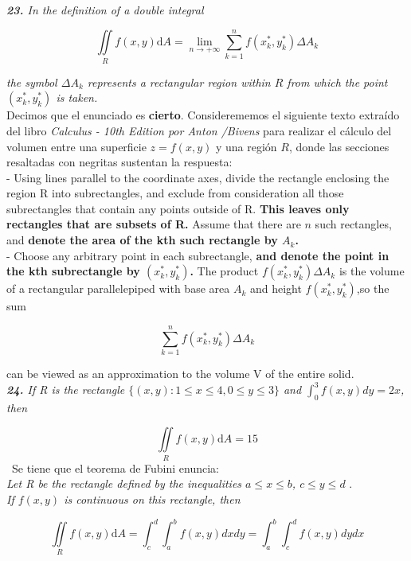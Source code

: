 \documentclass[a4paper,12pt]{article}
\begin{document}
	\textit{\textbf{23.} In the definition of a double integral}

		$$  \iint\limits_{R} f(x,y)\mathrm{d}A = \lim\limits_{n \rightarrow + \infty}
		 	\sum_{k=1}^{n} f(x^{*}_{k}, y^{*}_{k}) \Delta A_{k} $$

	\textit{ the symbol $ \Delta A_{k}$ represents a rectangular region within $R$
	 		from which the point $ (x^{*}_{k}, y^{*}_{k}) $ is taken.}\\

	Decimos que el enunciado es \textbf{cierto}. Considerememos el siguiente texto extraído
	del libro \textit{Calculus - 10th Edition por Anton /Bivens} para realizar el
	cálculo del volumen entre una superficie $ z = f(x,y)$ y una región $R$, donde
	las secciones resaltadas con negritas sustentan la respuesta: \\

	- Using lines parallel to the coordinate axes, divide the rectangle
	enclosing the region R into subrectangles, and exclude from consideration
	all those subrectangles that contain any points outside of R.
	\textbf{This leaves only rectangles that are subsets of R.} Assume that there are $n$
	such rectangles, and \textbf{denote the area of the kth such rectangle by $A_k$.} \\

	- Choose any arbitrary point in each subrectangle, \textbf{and denote the point in
	the kth subrectangle by $ (x^{*}_{k}, y^{*}_{k}) $.} The product
	$ f(x^{*}_{k}, y^{*}_{k}) \Delta A_k$  is the volume of a rectangular
	parallelepiped with base area $A_k$ and height $f(x^{*}_{k}, y^{*}_{k})$,so the sum

		$$ \sum_{k=1}^{n} f(x^{*}_{k}, y^{*}_{k}) \Delta A_{k} $$

	can be viewed as an approximation to the volume V of the entire solid.\\

	\textit{\textbf{24.} If R is the rectangle $ \{(x,y):1 \leq x \leq 4,0 \leq y \leq 3\} $
			and $\int_{0}^{3} f(x,y) dy = 2x$, then}

		$$ \iint\limits_{R} f(x,y)\mathrm{d}A = 15 $$
	\
	Se tiene que el teorema de Fubini enuncia:\\
	\textit{ Let R be the rectangle defined by the inequalities $a \leq x \leq b$, $c \leq y \leq d$ }.\\
	\textit{ If $f(x, y)$ is continuous on this rectangle, then }

		$$ \iint\limits_{R} f(x,y)\mathrm{d}A = \int_{c}^{d} \int_{a}^{b} f(x,y) dx dy
			= \int_{a}^{b} \int_{c}^{d} f(x,y) dy dx  $$
\end{document}
